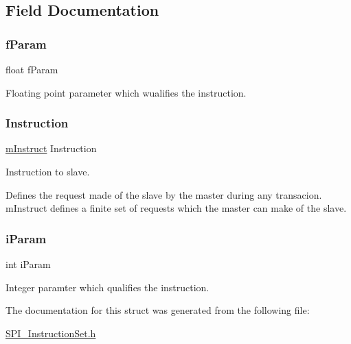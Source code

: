 \subsection{Field Documentation}
\mbox{\label{structm_cmd_af05b89ac7edf2c67bb3386c902369313}} 
\subsubsection{\texorpdfstring{fParam}{fParam}}
{\footnotesize\ttfamily float f\+Param}



Floating point parameter which wualifies the instruction. 

\mbox{\label{structm_cmd_a7adb91eb9d020c0f2650e99a857d2c3d}} 
\subsubsection{\texorpdfstring{Instruction}{Instruction}}
{\footnotesize\ttfamily \mbox{\hyperlink{_s_p_i___instruction_set_8h_afefab269eb3692ecb3e5fcdbb9440792}{m\+Instruct}} Instruction}



Instruction to slave. 

Defines the request made of the slave by the master during any transacion. m\+Instruct defines a finite set of requests which the master can make of the slave. \mbox{\label{structm_cmd_a4d0a4aab326d0ba8eb8128adb61c0888}} 
\subsubsection{\texorpdfstring{iParam}{iParam}}
{\footnotesize\ttfamily int i\+Param}



Integer paramter which qualifies the instruction. 



The documentation for this struct was generated from the following file\+:\begin{DoxyCompactItemize}
\item 
\mbox{\hyperlink{_s_p_i___instruction_set_8h}{S\+P\+I\+\_\+\+Instruction\+Set.\+h}}\end{DoxyCompactItemize}
